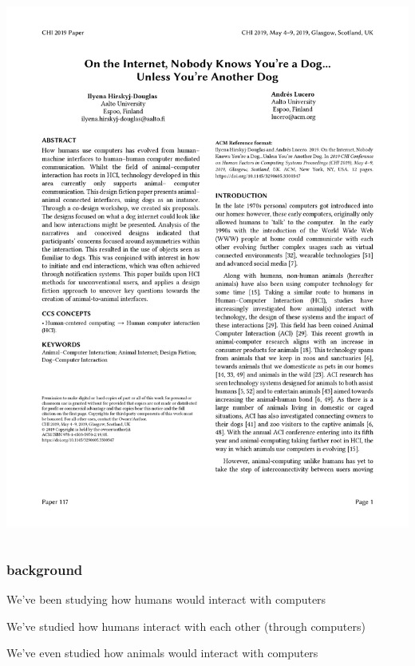 \documentclass[presentation]{subfiles}
\begin{document}
\begin{frame}[t]
    
\begin{columns}
\begin{column}{\textwidth}
\includegraphics[width=\textwidth]{figures/dog_cover.png}
\end{column}
\end{columns}

\end{frame}

\begin{frame}[t]\frametitle{background}
  We've been studying how \alert<1>{humans} would interact with \alert<1>{computers}

  We've studied how \alert<2>{humans} interact with \alert<2>{each other} (through computers)

  We've even studied how \alert<3>{animals} would interact with \alert<3>{computers}



\end{frame}
\end{document}

